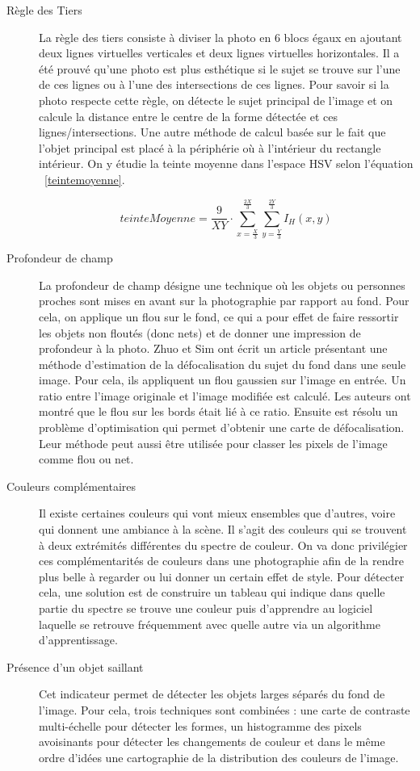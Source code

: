 \documentclass[11pt, french,screen]{report-rd-info}
\begin{document}
\begin{description}
\item[Règle des Tiers]
La règle des tiers consiste à diviser la photo en 6 blocs égaux en ajoutant deux lignes virtuelles verticales et deux lignes virtuelles horizontales. Il a  été prouvé qu’une photo est plus esthétique si le sujet se trouve sur l’une de ces lignes ou à l’une des intersections de ces lignes. Pour savoir si la photo respecte cette règle, on détecte le sujet principal de l’image et on calcule la distance entre le centre de la forme détectée et ces lignes/intersections. Une autre méthode de calcul basée sur le fait que l'objet principal est placé à la périphérie où à l'intérieur du rectangle intérieur. On y étudie la teinte moyenne dans l'espace HSV selon l'équation ~\ref{teintemoyenne}. 

\begin{equation}
teinteMoyenne = \frac{9}{XY}\cdot \sum_{x=\frac{X}{3}}^{\frac{2X}{3}} \sum_{y=\frac{Y}{3}}^{\frac{2Y}{3}} I_H(x,y)
\label{teintemoyenne}
\end{equation}

\item[Profondeur de champ]
La profondeur de champ désigne une technique où les objets ou personnes proches sont mises en avant sur la photographie par rapport au fond. Pour cela, on applique un flou sur  le fond, ce qui a pour effet de faire ressortir les objets non floutés (donc nets) et de donner une impression de profondeur à la photo. Zhuo et Sim ont écrit un article\cite{Zhuo2011} présentant une méthode d’estimation de la défocalisation du sujet du fond dans une seule image. Pour cela, ils appliquent un flou gaussien sur l’image en  entrée. Un ratio entre l’image originale et l’image modifiée est calculé. Les auteurs ont montré que le flou sur les bords était lié à ce ratio. Ensuite est résolu un problème d’optimisation qui permet d’obtenir une carte de défocalisation. Leur méthode peut aussi être utilisée pour classer les pixels de l’image comme flou ou net.
\item[Couleurs complémentaires]
Il existe certaines couleurs qui vont mieux ensembles que d’autres, voire qui donnent une ambiance à la scène. Il s’agit des couleurs qui se trouvent à deux extrémités différentes du spectre de couleur. On va donc privilégier ces complémentarités de couleurs dans une photographie afin de la rendre plus belle à regarder ou lui donner un certain effet de style. Pour détecter cela, une solution est de construire un tableau  qui indique dans quelle partie du spectre se trouve une couleur puis d’apprendre au logiciel laquelle se retrouve fréquemment  avec quelle autre via un algorithme d’apprentissage.
\item[Présence d'un objet saillant]
Cet indicateur permet de détecter les objets larges séparés du fond de l’image. Pour cela, trois techniques sont combinées : une carte de contraste multi-échelle pour détecter les formes, un histogramme des pixels avoisinants pour détecter les changements de couleur et dans le même ordre d’idées une cartographie de la distribution des couleurs de l’image.
\end{description}
\end{document}
